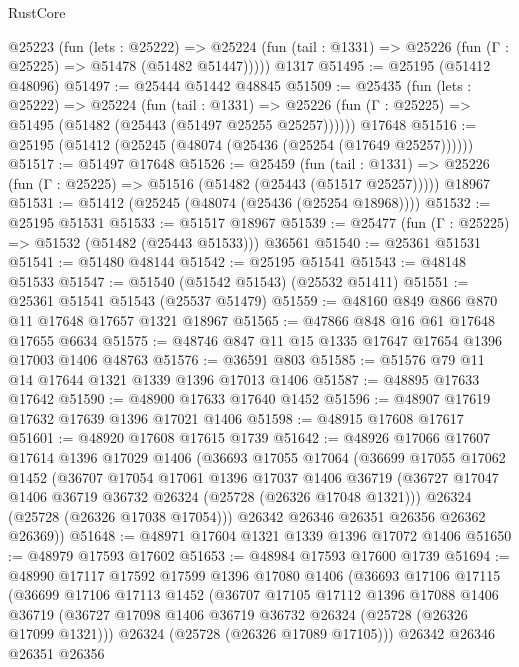 \begin{lexlean}{RustCore}
\begin{coremodule}
    @25223
      (fun (lets : @25222) =>
      @25224 (fun (tail : @1331) => @25226 (fun (Γ : @25225) => @51478 (@51482 @51447)))))
    @1317
@51495 := @25195 (@51412 @48096)
@51497 := @25444 @51442 @48845
@51509 := @25435
    (fun (lets : @25222) =>
    @25224
      (fun (tail : @1331) =>
      @25226 (fun (Γ : @25225) => @51495 (@51482 (@25443 (@51497 @25255 @25257))))))
    @17648
@51516 := @25195 (@51412 (@25245 (@48074 (@25436 (@25254 (@17649 @25257))))))
@51517 := @51497 @17648
@51526 := @25459
    (fun (tail : @1331) => @25226 (fun (Γ : @25225) => @51516 (@51482 (@25443 (@51517 @25257)))))
    @18967
@51531 := @51412 (@25245 (@48074 (@25436 (@25254 @18968))))
@51532 := @25195 @51531
@51533 := @51517 @18967
@51539 := @25477 (fun (Γ : @25225) => @51532 (@51482 (@25443 @51533))) @36561
@51540 := @25361 @51531
@51541 := @51480 @48144
@51542 := @25195 @51541
@51543 := @48148 @51533
@51547 := @51540 (@51542 @51543) (@25532 @51411)
@51551 := @25361 @51541 @51543 (@25537 @51479)
@51559 := @48160 @849 @866 @870 @11 @17648 @17657 @1321 @18967
@51565 := @47866 @848 @16 @61 @17648 @17655 @6634
@51575 := @48746 @847 @11 @15 @1335 @17647 @17654 @1396 @17003 @1406 @48763
@51576 := @36591 @803
@51585 := @51576 @79 @11 @14 @17644 @1321 @1339 @1396 @17013 @1406
@51587 := @48895 @17633 @17642
@51590 := @48900 @17633 @17640 @1452
@51596 := @48907 @17619 @17632 @17639 @1396 @17021 @1406
@51598 := @48915 @17608 @17617
@51601 := @48920 @17608 @17615 @1739
@51642 := @48926
    @17066
    @17607
    @17614
    @1396
    @17029
    @1406
    (@36693
      @17055
      @17064
      (@36699
        @17055
        @17062
        @1452
        (@36707
          @17054
          @17061
          @1396
          @17037
          @1406
          @36719
          (@36727 @17047 @1406 @36719 @36732 @26324 (@25728 (@26326 @17048 @1321)))
          @26324
          (@25728 (@26326 @17038 @17054)))
        @26342
        @26346
        @26351
        @26356
        @26362
        @26369))
@51648 := @48971 @17604 @1321 @1339 @1396 @17072 @1406
@51650 := @48979 @17593 @17602
@51653 := @48984 @17593 @17600 @1739
@51694 := @48990
    @17117
    @17592
    @17599
    @1396
    @17080
    @1406
    (@36693
      @17106
      @17115
      (@36699
        @17106
        @17113
        @1452
        (@36707
          @17105
          @17112
          @1396
          @17088
          @1406
          @36719
          (@36727 @17098 @1406 @36719 @36732 @26324 (@25728 (@26326 @17099 @1321)))
          @26324
          (@25728 (@26326 @17089 @17105)))
        @26342
        @26346
        @26351
        @26356

\end{coremodule}
\end{lexlean}
